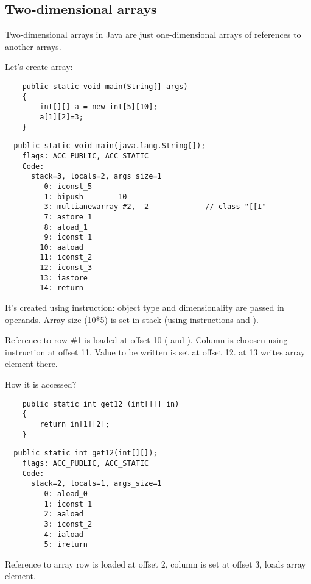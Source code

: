 \subsection{Two-dimensional arrays}

Two-dimensional arrays in Java are just one-dimensional arrays of references to another arrays.

Let's create array:

\begin{lstlisting}
	public static void main(String[] args)
	{
		int[][] a = new int[5][10];
		a[1][2]=3;
	}
\end{lstlisting}

\begin{lstlisting}
  public static void main(java.lang.String[]);
    flags: ACC_PUBLIC, ACC_STATIC
    Code:
      stack=3, locals=2, args_size=1
         0: iconst_5      
         1: bipush        10
         3: multianewarray #2,  2             // class "[[I"
         7: astore_1      
         8: aload_1       
         9: iconst_1      
        10: aaload        
        11: iconst_2      
        12: iconst_3      
        13: iastore       
        14: return        
\end{lstlisting}

It's created using  instruction: object type and dimensionality are passed
in operands. 
Array size (10*5) is set in stack (using instructions  and ).

Reference to row \#1 is loaded at offset 10 ( and ).
Column is choosen using  instruction at offset 11.
Value to be written is set at offset 12.
 at 13 writes array element there.

How it is accessed?

\begin{lstlisting}
	public static int get12 (int[][] in)
	{
		return in[1][2];
	}
\end{lstlisting}

\begin{lstlisting}
  public static int get12(int[][]);
    flags: ACC_PUBLIC, ACC_STATIC
    Code:
      stack=2, locals=1, args_size=1
         0: aload_0       
         1: iconst_1      
         2: aaload        
         3: iconst_2      
         4: iaload        
         5: ireturn       
\end{lstlisting}

Reference to array row is loaded at offset 2, column is set at offset 3, 
 loads array element.
